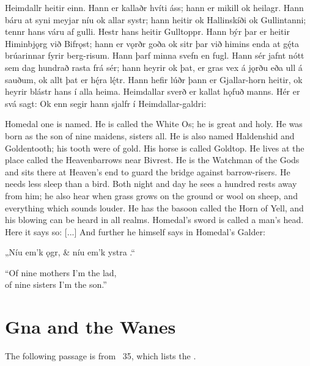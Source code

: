 \sectionline

\bpg\bpa Heimdallr heitir einn. Hann er kallaðr hvíti áss; hann er mikill ok heilagr. Hann báru at syni meyjar níu ok allar systr; hann heitir ok Hallinskíði ok Gullintanni; tennr hans váru af gulli. Hestr hans heitir Gulltoppr. Hann býr þar er heitir Himinbjǫrg við Bifrǫst; hann er vǫrðr goða ok sitr þar við himins enda at gę́ta brúarinnar fyrir berg-risum. Hann þarf minna svefn en fugl. Hann sér jafnt nótt sem dag hundrað rasta frá sér; hann heyrir ok þat, er gras vex á jǫrðu eða ull á sauðum, ok allt þat er hę́ra lę́tr. Hann hefir lúðr þann er Gjallar-horn heitir, ok heyrir blástr hans í alla heima. Heimdallar sverð er kallat hǫfuð manns. Hér er svá sagt:  Ok enn segir hann sjalfr í Heimdallar-galdri:\epa

\bpb Homedal one is named.  He is called the White Os; he is great and holy.  He was born as the son of nine maidens, sisters all.  He is also named Haldenshid and Goldentooth; his tooth were of gold.  His horse is called Goldtop.  He lives at the place called the Heavenbarrows near Bivrest.  He is the Watchman of the Gods and sits there at Heaven’s end to guard the bridge against barrow-risers.  He needs less sleep than a bird.  Both night and day he sees a hundred rests away from him; he also hear when grass grows on the ground or wool on sheep, and everything which sounds louder. He has the basoon called the Horn of Yell, and his blowing can be heard in all realms.  Homedal’s sword is called a man’s head.  Here it says so: [...] And further he himself says in Homedal’s Galder:\epb\epg


\bvg\bva%
„Níu em’k  ǫgr, &
níu em’k ystra .“\eva

\bvb “Of nine mothers I’m the lad, \\
of nine sisters I’m the son.”\evb\evg

\sectionline

\section{Gna and the Wanes}

The following passage is from \Gylfaginning\ 35, which lists the .

\sectionline

